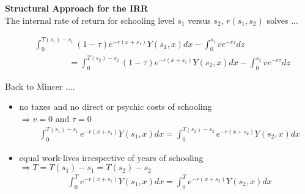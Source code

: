 \begin{frame}\textbf{Structural Approach for the IRR}\vspace{0.3cm}\\

The internal rate of return for schooling level $s_1$ versus $s_2$, $r(s_1, s_2)$ solves ...

\begin{align*}
&\int_{0}^{T(s_1) - s_1} (1 - \tau)e^{-r(x + s_1)}Y(s_1, x) dx  - \int_{0}^{s_1} v e^{-r z} dz\\
&\qquad\qquad =  \int_{0}^{T(s_2) - s_2} (1 - \tau)e^{-r(x + s_2)}Y(s_2, x) dx - \int_{0}^{s_2} v e^{-r z} dz
\end{align*}

\end{frame}
\begin{frame}
Back to Mincer ....

\begin{itemize}
\item no taxes and no direct or psychic costs of schooling \\\vspace{0.3cm}
\hspace{0.3cm}$\Rightarrow v = 0$ and $\tau = 0$\vspace{0.3cm}
\begin{align*}
&\int_{0}^{T(s_1) - s_1} e^{-r(x + s_1)}Y(s_1, x) dx  = \int_{0}^{T(s_2) - s_2} e^{-r(x + s_2)}Y(s_2, x) dx
\end{align*}
\end{itemize}\end{frame}
\begin{frame}
\begin{itemize}
\item equal work-lives irrespective of years of schooling \\\vspace{0.3cm}
\hspace{0.3cm}$\Rightarrow T = T(s_1) - s_1 = T(s_2) - s_2$\vspace{0.3cm}
\begin{align*}
&\int_{0}^T e^{-r(x + s_1)}Y(s_1, x) dx  = \int_{0}^T e^{-r(x + s_2)}Y(s_2, x) dx
\end{align*}
\end{itemize}
\end{frame}
